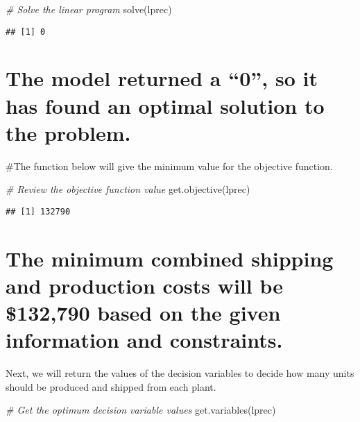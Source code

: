 \documentclass[
]{article}
\newenvironment{Shaded}{\begin{snugshade}}{\end{snugshade}}
\newcommand{\CommentTok}[1]{\textcolor[rgb]{0.56,0.35,0.01}{\textit{#1}}}
\newcommand{\FunctionTok}[1]{\textcolor[rgb]{0.00,0.00,0.00}{#1}}
\newcommand{\NormalTok}[1]{#1}
\begin{document}
\begin{Shaded}
\begin{Highlighting}[]
\CommentTok{\# Solve the linear program}
\FunctionTok{solve}\NormalTok{(lprec)}
\end{Highlighting}
\end{Shaded}

\begin{verbatim}
## [1] 0
\end{verbatim}

\hypertarget{the-model-returned-a-0-so-it-has-found-an-optimal-solution-to-the-problem.}{%
\section{The model returned a ``0'', so it has found an optimal solution
to the
problem.}\label{the-model-returned-a-0-so-it-has-found-an-optimal-solution-to-the-problem.}}

\#The function below will give the minimum value for the objective
function.

\begin{Shaded}
\begin{Highlighting}[]
\CommentTok{\# Review the objective function value}
\FunctionTok{get.objective}\NormalTok{(lprec)}
\end{Highlighting}
\end{Shaded}

\begin{verbatim}
## [1] 132790
\end{verbatim}

\hypertarget{the-minimum-combined-shipping-and-production-costs-will-be-132790-based-on-the-given-information-and-constraints.}{%
\section{The minimum combined shipping and production costs will be
\$132,790 based on the given information and
constraints.}\label{the-minimum-combined-shipping-and-production-costs-will-be-132790-based-on-the-given-information-and-constraints.}}

Next, we will return the values of the decision variables to decide how
many units should be produced and shipped from each plant.

\begin{Shaded}
\begin{Highlighting}[]
\CommentTok{\# Get the optimum decision variable values}
\FunctionTok{get.variables}\NormalTok{(lprec)}
\end{Highlighting}
\end{Shaded}
\end{document}
